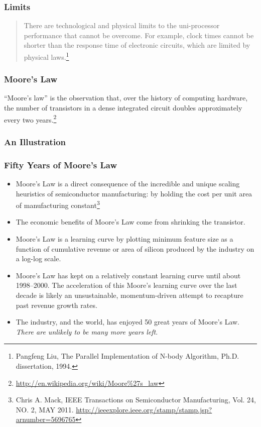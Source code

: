 \documentclass{beamer}
\begin{document}
\begin{CJK}{UTF8}{bsmi}
\begin{frame}
\frametitle{Limits}
\begin{quote}There are technological and physical limits to the uni-processor performance that cannot be overcome. 
For example, clock times cannot be shorter than the response time of electronic circuits, which are limited by physical laws.\footnote{Pangfeng Liu, The Parallel Implementation of N-body Algorithm, Ph.D. dissertation, 1994.}
\end{quote}
\end{frame}

\begin{frame}
\frametitle{Moore's Law}
``Moore's law'' is the observation that, over the history of computing
hardware, the number of transistors in a dense integrated circuit
doubles approximately every two
years.\footnote{\url{http://en.wikipedia.org/wiki/Moore\%27s_law}}
\end{frame}

\begin{frame}
\frametitle{An Illustration}
\centerline{}
\end{frame}

\begin{frame}
\frametitle{Fifty Years of Moore's Law}
\begin{itemize}
\item Moore's Law is a direct consequence of the incredible and unique
  scaling heuristics of semiconductor manufacturing: by holding the
  cost per unit area of manufacturing constant\footnote{Chris
    A. Mack, IEEE Transactions on Semiconductor Manufacturing,
    Vol. 24, NO. 2, MAY
    2011. \url{http://ieeexplore.ieee.org/stamp/stamp.jsp?arnumber=5696765}}
\item The economic benefits of Moore's Law come from shrinking the transistor.
\end{itemize}
\end{frame}

\begin{frame}
\begin{itemize}
\item Moore's Law is a learning curve by plotting minimum feature size as a function of cumulative revenue or area of silicon produced by the industry on a log-log scale.
\item Moore's Law has kept on a relatively constant learning curve until about 1998–2000. The acceleration of this Moore's learning curve over the last decade is likely an unsustainable, momentum-driven attempt to recapture past revenue growth rates.
\item The industry, and the world, has enjoyed 50 great years of Moore's Law. {\em There are unlikely to be many more years left}.
\end{itemize}
\end{frame}


\end{CJK}
\end{document}

